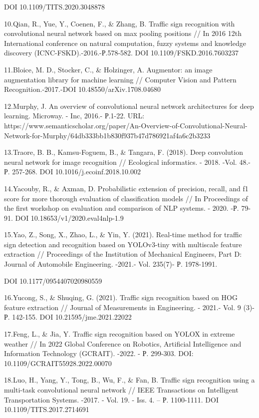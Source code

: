DOI 10.1109/TITS.2020.3048878

10.Qian, R., Yue, Y., Coenen, F., \& Zhang, B. Traffic sign recognition
with convolutional neural network based on max pooling positions // In
2016 12th International conference on natural computation, fuzzy systems
and knowledge discovery (ICNC-FSKD).-2016.-Р.578-582. DOI
10.1109/FSKD.2016.7603237

11.Bloice, M. D., Stocker, C., \& Holzinger, A. Augmentor: an image
augmentation library for machine learning // Computer Vision and Pattern
Recognition.-2017.-DOI 10.48550/arXiv.1708.04680

12.Murphy, J. An overview of convolutional neural network architectures
for deep learning. Microway. - Inc, 2016.- Р.1-22. URL:
https://www.semanticscholar.org/paper/An-Overview-of-Convolutional-Neural-Network-for-Murphy/64db333bb1b830f937b47d786921af4a6c2b3233

13.Traore, B. B., Kamsu-Foguem, B., \& Tangara, F. (2018). Deep
convolution neural network for image recognition // Ecological
informatics. - 2018. -Vol. 48.- Р. 257-268. DOI
10.1016/j.ecoinf.2018.10.002

14.Yacouby, R., \& Axman, D. Probabilistic extension of precision,
recall, and f1 score for more thorough evaluation of classification
models // In Proceedings of the first workshop on evaluation and
comparison of NLP systems. - 2020. -Р. 79-91. DOI
10.18653/v1/2020.eval4nlp-1.9

15.Yao, Z., Song, X., Zhao, L., \& Yin, Y. (2021). Real-time method for
traffic sign detection and recognition based on YOLOv3-tiny with
multiscale feature extraction // Proceedings of the Institution of
Mechanical Engineers, Part D: Journal of Automobile Engineering. -2021.-
Vol. 235(7)- Р. 1978-1991.

DOI 10.1177/0954407020980559

16.Yucong, S., \& Shuqing, G. (2021). Traffic sign recognition based on
HOG feature extraction // Journal of Measurements in Engineering. -
2021.- Vol. 9 (3)-Р. 142-155. DOI 10.21595/jme.2021.22022

17.Feng, L., \& Jia, Y. Traffic sign recognition based on YOLOX in
extreme weather // In 2022 Global Conference on Robotics, Artificial
Intelligence and Information Technology (GCRAIT). -2022. - Р. 299-303.
DOI: 10.1109/GCRAIT55928.2022.00070

18.Luo, H., Yang, Y., Tong, B., Wu, F., \& Fan, B. Traffic sign
recognition using a multi-task convolutional neural network // IEEE
Transactions on Intelligent Transportation Systems. -2017. - Vol. 19. -
Iss. 4. -- Р. 1100-1111. DOI 10.1109/TITS.2017.2714691

